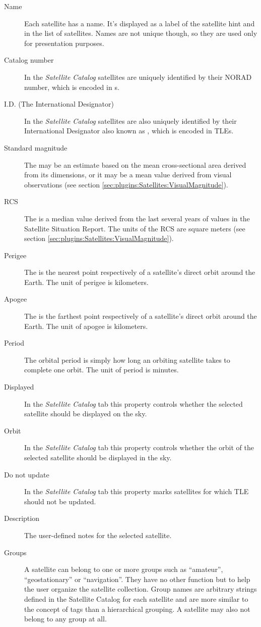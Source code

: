 \begin{description}
\item[Name] Each satellite has a name. It's displayed as a label of
  the satellite hint and in the list of satellites. Names are not
  unique though, so they are used only for presentation purposes.
\item[Catalog number] In the \emph{Satellite Catalog} satellites are
  uniquely identified by their NORAD number, which is encoded in
  s.
\item[I.D. (The International Designator)] In the \emph{Satellite
  Catalog} satellites are also uniquely identified by their
  International Designator also known as ,
  which is encoded in TLEs.
\item[Standard magnitude] The  may be an estimate based on the
  mean cross-sectional area derived from its dimensions, or it may be
  a mean value derived from visual observations (see section \ref{sec:plugins:Satellites:VisualMagnitude}).
\item[RCS] The  is a median value derived from the last several years of
  values in the Satellite Situation Report. The units of the RCS are
  square meters (see section \ref{sec:plugins:Satellites:VisualMagnitude}).
\item[Perigee] The  is the nearest point respectively of a
  satellite's direct orbit around the Earth. The unit of perigee is
  kilometers.
\item[Apogee] The  is the farthest point
  respectively of a satellite's direct orbit around the Earth. The
  unit of apogee is kilometers.
\item[Period] The orbital period is simply how long an orbiting
  satellite takes to complete one orbit. The unit of period is
  minutes.
\item[Displayed] In the \emph{Satellite Catalog} tab this property
  controls whether the selected satellite should be displayed on the
  sky.
\item[Orbit] In the \emph{Satellite Catalog} tab this property
  controls whether the orbit of the selected satellite should be
  displayed in the sky.
\item[Do not update] In the \emph{Satellite Catalog} tab this property
  marks satellites for which TLE should not be updated.
\item[Description] The user-defined notes for the selected satellite.
\item[Groups]
A satellite can belong to one or more groups such as ``amateur'',
``geostationary'' or ``navigation''. They have no other function but
to help the user organize the satellite collection.  Group names are
arbitrary strings defined in the Satellite Catalog for each satellite
and are more similar to the concept of tags than a hierarchical
grouping. A satellite may also not belong to any group at all.


\end{description}
